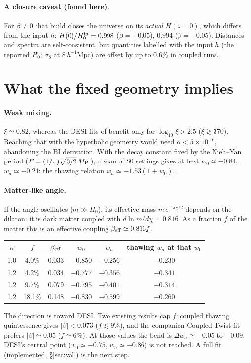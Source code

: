 \documentclass[11pt]{article}
\newcommand{\Mp}{M_{\rm Pl}}
\begin{document}
\paragraph{A closure caveat (found here).} For $\beta\neq0$ that build closes the universe on its \emph{actual}
$H(z{=}0)$, which differs from the input $h$: $H(0)/H_0^{\rm in}=0.998$ ($\beta=+0.05$), $0.994$ ($\beta=-0.05$).
Distances and spectra are self-consistent, but quantities labelled with the input $h$ (the reported $H_0$; $\sigma_8$
at $8\,h^{-1}$Mpc) are offset by up to $0.6\%$ in coupled runs.

\section{What the fixed geometry implies}
\paragraph{Weak mixing.} $\xi\simeq0.82$, whereas the DESI fits of \cite{ramos2026} benefit only for
$\log_{10}\xi>2.5$ ($\xi\gtrsim370$). Reaching that with the hyperbolic geometry would need $\alpha<5\times10^{-6}$,
abandoning the BI derivation. With the decay constant fixed by the Nieh--Yan period ($F=(4/\pi)\sqrt{3/2}\,\Mp$),
a scan of 80 settings gives at best $w_0\simeq-0.84$, $w_a\simeq-0.24$: the thawing relation
$w_a\simeq-1.53(1+w_0)$.

\paragraph{Matter-like angle.} If the angle oscillates ($m\gg H_0$), its effective mass $m\,e^{-\lambda\chi/2}$
depends on the dilaton: it is dark matter coupled with $d\ln m/d\chi=0.816$. As a fraction $f$ of the matter this is an
effective coupling $\beta_{\rm eff}\simeq0.816f$.
\begin{center}\small
\begin{tabular}{cccccc}
\toprule
$\kappa$ & $f$ & $\beta_{\rm eff}$ & $w_0$ & $w_a$ & thawing $w_a$ at that $w_0$\\
\midrule
1.0 & 4.0\% & 0.033 & $-0.850$ & $-0.256$ & $-0.230$\\
1.2 & 4.2\% & 0.034 & $-0.777$ & $-0.356$ & $-0.341$\\
1.2 & 9.7\% & 0.079 & $-0.795$ & $-0.401$ & $-0.314$\\
1.2 & 18.1\% & 0.148 & $-0.830$ & $-0.599$ & $-0.260$\\
\bottomrule
\end{tabular}
\end{center}
The direction is toward DESI. Two existing results cap $f$: coupled thawing quintessence gives $|\beta|<0.073$
\cite{babu2026} ($f\lesssim9\%$), and the companion Coupled Twist fit prefers $|\beta|\simeq0.05$ ($f\simeq6\%$). At
those values the bend is $\Delta w_a\simeq-0.05$ to $-0.09$. DESI's central point ($w_0\simeq-0.75$, $w_a\simeq-0.86$)
is not reached. A full fit (implemented, \S\ref{sec:val}) is the next step.
\end{document}
